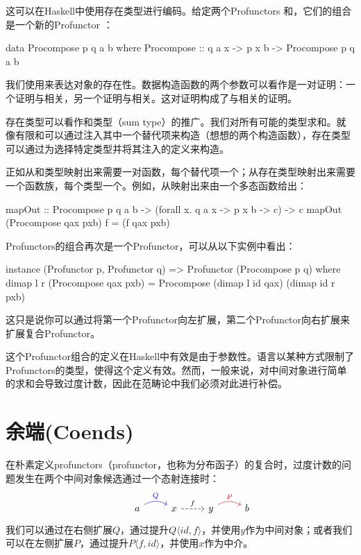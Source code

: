 \documentclass[DaoFP]{subfiles}
\begin{document}
这可以在Haskell中使用存在类型进行编码。给定两个Profunctors 和，它们的组合是一个新的Profunctor ：
\begin{haskell}
data Procompose p q a b where
  Procompose ::  q a x -> p x b -> Procompose p q a b
\end{haskell}
我们使用来表达对象的存在性。数据构造函数的两个参数可以看作是一对证明：一个证明与相关，另一个证明与相关。这对证明构成了与相关的证明。

存在类型可以看作和类型（sum type）的推广。我们对所有可能的类型求和。就像有限和可以通过注入其中一个替代项来构造（想想的两个构造函数），存在类型可以通过为选择特定类型并将其注入的定义来构造。

正如从和类型映射出来需要一对函数，每个替代项一个；从存在类型映射出来需要一个函数族，每个类型一个。例如，从映射出来由一个多态函数给出：
\begin{haskell}
mapOut :: Procompose p q a b -> (forall x. q a x -> p x b -> c) -> c
mapOut (Procompose qax pxb) f = (f qax pxb)
\end{haskell}

Profunctors的组合再次是一个Profunctor，可以从以下实例中看出：
\begin{haskell}
instance (Profunctor p, Profunctor q) => Profunctor (Procompose p q) 
  where
    dimap l r (Procompose qax pxb) = 
               Procompose (dimap l id qax) (dimap id r pxb)
\end{haskell}
这只是说你可以通过将第一个Profunctor向左扩展，第二个Profunctor向右扩展来扩展复合Profunctor。

这个Profunctor组合的定义在Haskell中有效是由于参数性。语言以某种方式限制了Profunctors的类型，使得这个定义有效。然而，一般来说，对中间对象进行简单的求和会导致过度计数，因此在范畴论中我们必须对此进行补偿。

\section{余端(Coends)}

在朴素定义profunctors（profunctor，也称为分布函子）的复合时，过度计数的问题发生在两个中间对象候选通过一个态射连接时：
\[
 \begin{tikzcd}
  & a
  \arrow[r, bend left, blue, "Q"]
  &x
  \arrow[r, dashed, "f"]
 & y
  \arrow[r, bend left, red, "P"]
 & b
  \end{tikzcd}
\]
我们可以通过在右侧扩展$Q$，通过提升$Q \langle id, f \rangle$，并使用$y$作为中间对象；或者我们可以在左侧扩展$P$，通过提升$P \langle f, id \rangle$，并使用$x$作为中介。
\end{document}
